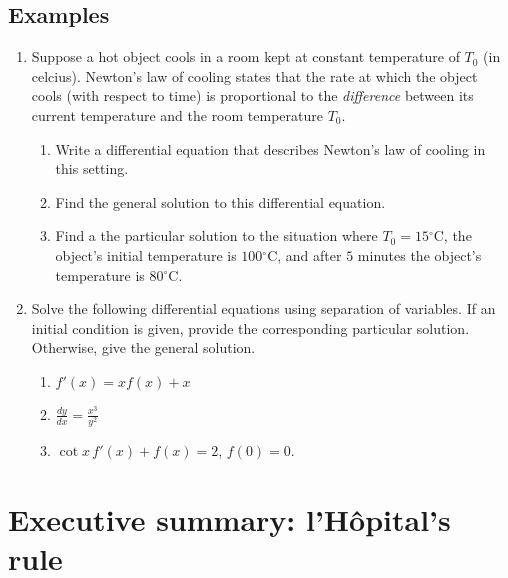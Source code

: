 \subsection*{Examples}
\begin{enumerate}
  \item Suppose a hot object cools in a room kept at constant temperature of $T_0$ (in celcius). Newton's law of cooling states that the rate at which the object cools (with respect to time) is proportional to the {\em difference} between its current temperature and the room temperature $T_0$.
  \begin{enumerate}
    \item Write a differential equation that describes Newton's law of cooling in this setting.
    \item Find the general solution to this differential equation.
    \item Find a the particular solution to the situation where $T_0=15$$^\circ$C, the object's initial temperature is $100$$^\circ$C, and after $5$ minutes the object's temperature is $80$$^\circ$C.
  \end{enumerate}
  \item Solve the following differential equations using separation of variables. If an initial condition is given, provide the corresponding particular solution. Otherwise, give the general solution.
  \begin{enumerate}
    \item $\displaystyle f'(x)=xf(x)+x$
    \item $\displaystyle\frac{dy}{dx}=\frac{x^3}{y^2}$
    \item $\cot x\, f'(x)+f(x)=2$, $f(0)=0$.
  \end{enumerate}
\end{enumerate}




\newpage

\section{Executive summary: l'H\^opital's rule}

\thispagestyle{fancy}
